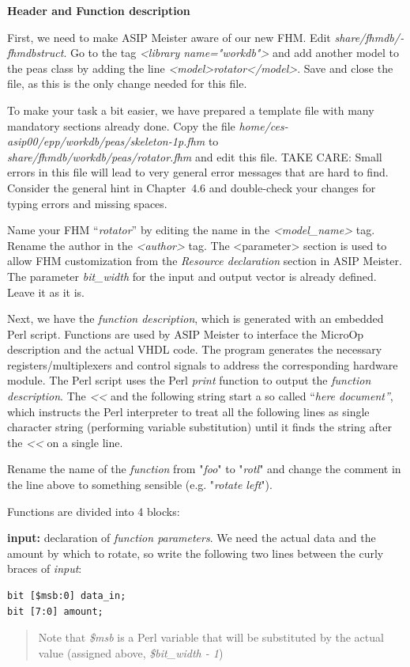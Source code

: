 \textbf{Header and Function description}

First, we need to make ASIP Meister aware of our new FHM. Edit
\emph{share/­fhmdb/­fhmdbstruct}. Go to the tag \emph{\textless library
name="workdb"\textgreater{}} and add another model to the peas class by
adding the line
\emph{\textless model\textgreater rotator\textless/model\textgreater{}}.
Save and close the file, as this is the only change needed for this
file.

To make your task a bit easier, we have prepared a template file with
many mandatory sections already done. Copy the file
\emph{home/ces-asip00/epp/workdb/peas/skeleton-1p.fhm} to
\emph{share/fhmdb/workdb/peas/rotator.fhm} and edit this file. TAKE
CARE: Small errors in this file will lead to very general error messages
that are hard to find. Consider the general hint in Chapter~4.6 and
double-check your changes for typing errors and missing spaces.

Name your FHM ``\emph{rotator}'' by editing the name in the
\emph{\textless model\_name\textgreater{}} tag. Rename the author in the
\emph{\textless author\textgreater{}} tag. The
\textless parameter\textgreater{} section is used to allow FHM
customization from the \emph{Resource declaration} section in ASIP
Meister. The parameter \emph{bit\_width} for the input and output vector
is already defined. Leave it as it is.

Next, we have the \emph{function description}, which is generated with
an embedded Perl script. Functions are used by ASIP Meister to interface
the MicroOp description and the actual VHDL code. The program generates
the necessary registers/multiplexers and control signals to address the
corresponding hardware module. The Perl script uses the Perl
\emph{print} function to output the \emph{function description}. The 
\emph{\textless\textless{}} and the following string start a so called
``\emph{here document''}, which instructs the Perl interpreter to treat
all the following lines as single character string (performing variable
substitution) until it finds the string after the
\emph{\textless\textless{}} on a single line.

Rename the name of the \emph{function} from "\emph{foo}" to
"\emph{rotl}" and change the comment in the line above to something
sensible (e.g. "\emph{rotate left}").

Functions are divided into 4 blocks:

\textbf{input:} declaration of \emph{function parameters}. We need the
actual data and the amount by which to rotate, so write the following
two lines between the curly braces of \emph{input}:
\begin{lstlisting}
bit [$msb:0] data_in;
bit [7:0] amount;
\end{lstlisting}
\begin{quote}
Note that \emph{\$msb} is a Perl variable that will be substituted by
the actual value (assigned above, \emph{\$bit\_width - 1})
\end{quote}

